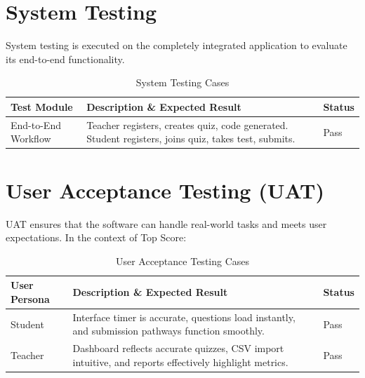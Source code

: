\section{System Testing}
System testing is executed on the completely integrated application to evaluate its end-to-end functionality.

\begin{table}[H]
    \centering
    \begin{tabular}{|p{4cm}|p{7cm}|l|}
        \hline
        \textbf{Test Module} & \textbf{Description \& Expected Result} & \textbf{Status} \\
        \hline
        End-to-End Workflow & Teacher registers, creates quiz, code generated. Student registers, joins quiz, takes test, submits. & Pass \\
        \hline
    \end{tabular}
    \caption{System Testing Cases}
    \label{tab:system_testing}
\end{table}

\section{User Acceptance Testing (UAT)}
UAT ensures that the software can handle real-world tasks and meets user expectations. In the context of Top Score:

\begin{table}[H]
    \centering
    \begin{tabular}{|p{4cm}|p{7cm}|l|}
        \hline
        \textbf{User Persona} & \textbf{Description \& Expected Result} & \textbf{Status} \\
        \hline
        Student & Interface timer is accurate, questions load instantly, and submission pathways function smoothly. & Pass \\
        \hline
        Teacher & Dashboard reflects accurate quizzes, CSV import intuitive, and reports effectively highlight metrics. & Pass \\
        \hline
    \end{tabular}
    \caption{User Acceptance Testing Cases}
    \label{tab:uat_testing}
\end{table}
